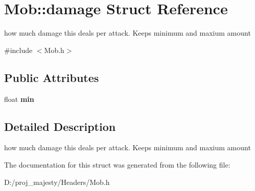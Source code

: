 \hypertarget{struct_mob_1_1damage}{}\section{Mob\+:\+:damage Struct Reference}
\label{struct_mob_1_1damage}


how much damage this deals per attack. Keeps minimum and maxium amount  




{\ttfamily \#include $<$Mob.\+h$>$}

\subsection*{Public Attributes}
\begin{DoxyCompactItemize}
\item 
float {\bfseries min}\hypertarget{struct_mob_1_1damage_a998e416f7bf70858d8cf63c789b2d284}{}\label{struct_mob_1_1damage_a998e416f7bf70858d8cf63c789b2d284}

\end{DoxyCompactItemize}


\subsection{Detailed Description}
how much damage this deals per attack. Keeps minimum and maxium amount 

The documentation for this struct was generated from the following file\+:\begin{DoxyCompactItemize}
\item 
D\+:/proj\+\_\+majesty/\+Headers/Mob.\+h\end{DoxyCompactItemize}
